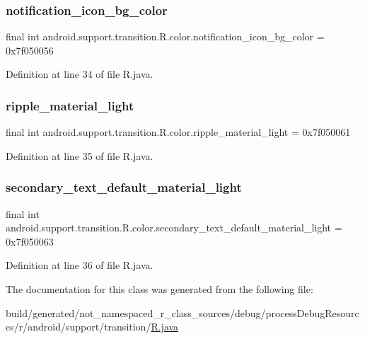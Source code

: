 \subsubsection{\texorpdfstring{notification\_icon\_bg\_color}{notification\_icon\_bg\_color}}
{\footnotesize\ttfamily final int android.\+support.\+transition.\+R.\+color.\+notification\+\_\+icon\+\_\+bg\+\_\+color = 0x7f050056\hspace{0.3cm}{\ttfamily [static]}}



Definition at line 34 of file R.\+java.

\mbox{\label{classandroid_1_1support_1_1transition_1_1_r_1_1color_afab65b7b77b985fd99ac16a5da6a69f9}} 
\subsubsection{\texorpdfstring{ripple\_material\_light}{ripple\_material\_light}}
{\footnotesize\ttfamily final int android.\+support.\+transition.\+R.\+color.\+ripple\+\_\+material\+\_\+light = 0x7f050061\hspace{0.3cm}{\ttfamily [static]}}



Definition at line 35 of file R.\+java.

\mbox{\label{classandroid_1_1support_1_1transition_1_1_r_1_1color_afbd843fca5d7d47368461266ae06ad27}} 
\subsubsection{\texorpdfstring{secondary\_text\_default\_material\_light}{secondary\_text\_default\_material\_light}}
{\footnotesize\ttfamily final int android.\+support.\+transition.\+R.\+color.\+secondary\+\_\+text\+\_\+default\+\_\+material\+\_\+light = 0x7f050063\hspace{0.3cm}{\ttfamily [static]}}



Definition at line 36 of file R.\+java.



The documentation for this class was generated from the following file\+:\begin{DoxyCompactItemize}
\item 
build/generated/not\+\_\+namespaced\+\_\+r\+\_\+class\+\_\+sources/debug/process\+Debug\+Resources/r/android/support/transition/\mbox{\hyperlink{android_2support_2transition_2_r_8java}{R.\+java}}\end{DoxyCompactItemize}
